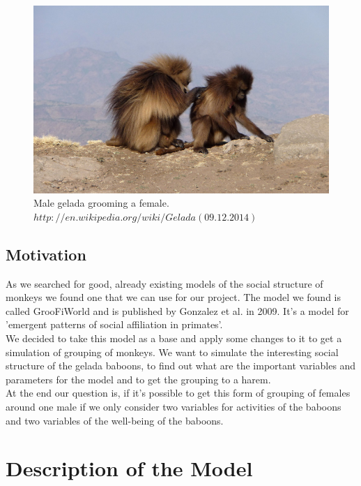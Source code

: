 \documentclass[11pt]{article}
\begin{document}
\begin{figure}[H]
\centering
\includegraphics[scale=0.35]{Photos/Dzelady}
\caption[Male gelada grooming a female]{Male gelada grooming a female. $http://en.wikipedia.org/wiki/Gelada (09.12.2014)$}
\label{fig:Grooming}
\end{figure}

\subsection{Motivation}
\label{sec:Motivation}
As we searched for good, already existing models of the social structure of monkeys we found one that we can use for our project. The model we found is called GrooFiWorld and is published by Gonzalez et al. in 2009\cite{Puga-Gonzalez2009}. It's a model for 'emergent patterns of social affiliation in primates'\cite{Puga-Gonzalez2009}.
\\
We decided to take this model as a base and apply some changes to it to get a simulation of grouping of monkeys. We want to simulate the interesting social structure of the gelada baboons, to find out what are the important variables and parameters for the model and to get the grouping to a harem.\\
At the end our question is, if it's possible to get this form of grouping of females around one male if we only consider two variables for activities of the baboons and two variables of the well-being of the baboons.




\section{Description of the Model}
\end{document}
